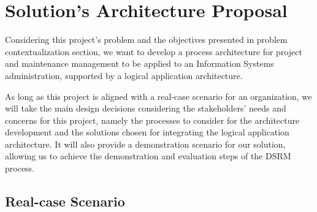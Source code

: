 
% 
% 

\section{Solution's Architecture Proposal}

Considering this project's problem and the objectives presented in problem contextualization section, we want to develop a process architecture for project and maintenance management to be applied to an Information Systems administration, supported by a logical application architecture.\par
As long as this project is aligned with a real-case scenario for an organization, we will take the main design decisions considering the stakeholders' needs and concerns for this project, namely the processes to consider for the architecture development and the solutions chosen for integrating the logical application architecture. It will also provide a demonstration scenario for our solution, allowing us to achieve the demonstration and evaluation steps of the DSRM process.\par 



\subsection{Real-case Scenario}

